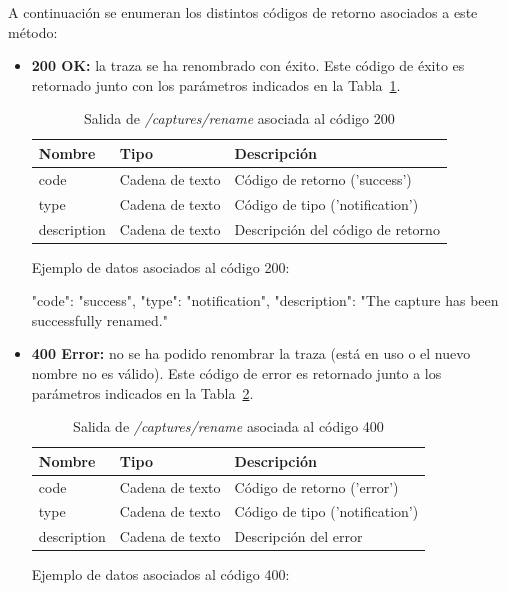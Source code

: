 A continuación se enumeran los distintos códigos de retorno asociados a este método:
\begin{itemize}

\item{\textbf{200 OK:} la \gls{traza} se ha renombrado con éxito.
Este código de éxito es retornado junto con los parámetros indicados en la Tabla~\ref{extra:api:capturesrename:ok}.
\begin{table}[H]
\centering
\begin{tabular}{|l|l|l|}
\hline
\rowcolor[HTML]{F5F5F5}
\textbf{Nombre}  & \textbf{Tipo}   & \textbf{Descripción}              \\ \hline
code             & Cadena de texto & Código de retorno ('success')     \\ \hline
type             & Cadena de texto & Código de tipo ('notification')   \\ \hline
description      & Cadena de texto & Descripción del código de retorno \\ \hline
\end{tabular}
\caption{Salida de \textit{/captures/rename} asociada al código 200}
\label{extra:api:capturesrename:ok}
\end{table}
\begin{minipage}{\textwidth}
Ejemplo de datos asociados al código 200:

\begin{code}[language=json]
{
  "code": "success",
  "type": "notification",
  "description": "The capture has been successfully renamed."
}
\end{code}
\end{minipage}
}

\item{\textbf{400 Error:} no se ha podido renombrar la \gls{traza} (está en uso o el nuevo nombre no es válido).
Este código de error es retornado junto a los parámetros indicados en la Tabla~\ref{extra:api:capturesrename:error}.
\begin{table}[H]
\centering
\begin{tabular}{|l|l|l|}
\hline
\rowcolor[HTML]{F5F5F5}
\textbf{Nombre}  & \textbf{Tipo}   & \textbf{Descripción}            \\ \hline
code             & Cadena de texto & Código de retorno ('error')     \\ \hline
type             & Cadena de texto & Código de tipo ('notification') \\ \hline
description      & Cadena de texto & Descripción del error           \\ \hline
\end{tabular}
\caption{Salida de \textit{/captures/rename} asociada al código 400}
\label{extra:api:capturesrename:error}
\end{table}
\begin{minipage}{\textwidth}
Ejemplo de datos asociados al código 400:


\end{minipage}}
\end{itemize}
